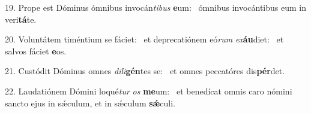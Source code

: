 19. Prope est Dóminus ómnibus invocán\textit{ti}\textit{bus} \textbf{e}um: \ast\  ómnibus invocántibus eum in veri\textbf{tá}te.\

20. Voluntátem timéntium se fáciet: \dag\  et deprecatiónem eó\textit{rum} \textit{ex}\textbf{áu}diet: \ast\  et salvos fáciet \textbf{e}os.\

21. Custódit Dóminus omnes \textit{di}\textit{li}\textbf{gén}tes se: \ast\  et omnes peccatóres dis\textbf{pér}det.\

22. Laudatiónem Dómini loqué\textit{tur} \textit{os} \textbf{me}um: \ast\  et benedícat omnis caro nómini sancto ejus in sǽculum, et in sǽculum \textbf{sǽ}culi.\

